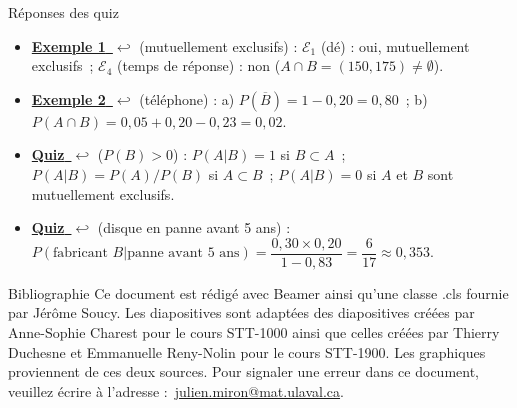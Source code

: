 \documentclass{BeamerTemplate}
\newcommand{\retour}[2]{\hyperlink{#1}{\textbf{#2}~{\color{gray}$\hookleftarrow$}}}
\begin{document}
\begin{frame}[t,label=rep-quiz]{Réponses des quiz}
\footnotesize
\begin{itemize}
\item \retour{ex1}{Exemple 1} (mutuellement exclusifs) : $\mathcal{E}_1$ (dé) : oui, mutuellement exclusifs~;
$\mathcal{E}_4$ (temps de réponse) : non ($A\cap B=(150,175)\neq\emptyset$).
\item \retour{ex2}{Exemple 2} (téléphone) : a) $P(\overline{B})=1-0{,}20=0{,}80$~; b) $P(A\cap B)=
0{,}05+0{,}20-0{,}23=0{,}02$.
\item \retour{quizpab}{Quiz} ($P(B)>0$) : $P(A|B)=1$ si $B\subset A$~; $P(A|B)=P(A)/P(B)$ si
$A\subset B$~; $P(A|B)=0$ si $A$ et $B$ sont mutuellement exclusifs.
\item \retour{quizbayes}{Quiz} (disque en panne avant 5 ans) : $P(\text{fabricant }B|\text{panne avant 5 ans})=\dfrac{0{,}30\times0{,}20}{1-0{,}83}=\dfrac{6}{17}\approx0{,}353$.
\end{itemize}
\end{frame}

\begin{frame}{Bibliographie}
 	Ce document est rédigé avec Beamer ainsi qu'une classe .cls fournie par Jérôme Soucy. Les diapositives sont adaptées des diapositives créées par Anne-Sophie Charest
 pour le cours STT-1000 ainsi que celles créées par Thierry Duchesne et Emmanuelle Reny-Nolin pour le cours STT-1900. Les graphiques proviennent de ces deux sources.
 	\printbibliography
 	\vfill
 	\footnotesize Pour signaler une erreur dans ce document, veuillez écrire à l'adresse :~\href{mailto:julien.miron@mat.ulaval.ca}{julien.miron@mat.ulaval.ca}.
 \end{frame}
\end{document}
